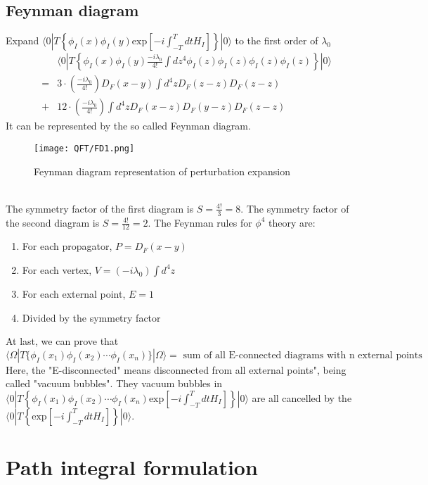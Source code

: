 \subsection{Feynman diagram}
Expand $\langle 0 | T \left\{ \phi_I(x) \phi_I(y) \mathrm{exp} \left[ -i \int_{-T}^{T} dt H_I \right]\right\} | 0 \rangle$ to the first order of $\lambda_0$
\begin{eqnarray}
& &\langle 0 | T \left\{ \phi_I(x) \phi_I(y) \frac{-i\lambda_0}{4!} \int dz^4 \phi_I(z) \phi_I(z) \phi_I(z) \phi_I(z) \right\} | 0 \rangle \nonumber \\
&=& 3 \cdot (\frac{-i\lambda_0}{4!}) D_F(x-y) \int d^4 z D_F(z-z) D_F(z-z) \nonumber \\
&+& 12 \cdot (\frac{-i\lambda_0}{4!}) \int d^4 z  D_F(x-z) D_F(y-z) D_F(z-z) \nonumber
\end{eqnarray}
It can be represented by the so called Feynman diagram.
\begin{figure}[!h]
\centering
\texttt{[image: QFT/FD1.png]}
\caption{Feynman diagram representation of perturbation expansion}
\end{figure}
\\
The symmetry factor of the first diagram is $S = \frac{4!}{3} = 8$.
The symmetry factor of the second diagram is $S = \frac{4!}{12} = 2$.
The Feynman rules for $\phi^4$ theory are:
\begin{enumerate}
\item For each propagator, $P = D_F(x-y)$
\item For each vertex, $V = (-i\lambda_0)\int d^4z$
\item For each external point, $E=1$
\item Divided by the symmetry factor
\end{enumerate}
At last, we can prove that
\[\langle \Omega | T \{ \phi_I(x_1) \phi_I(x_2) \cdots \phi_I(x_n) \} | \Omega \rangle = \mbox{ sum of all E-connected diagrams with n external points}\]
Here, the "E-disconnected" means disconnected from all external points", being called "vacuum bubbles". They vacuum bubbles in $\langle 0 | T \left\{ \phi_I(x_1) \phi_I(x_2) \cdots \phi_I(x_n) \mathrm{exp} \left[ -i \int_{-T}^{T} dt H_I \right]\right\} | 0 \rangle$ are all cancelled by the $\langle 0 | T \left\{ \mathrm{exp} \left[ -i \int_{-T}^{T} dt H_I \right]\right\} | 0 \rangle$.

\section{Path integral formulation}

